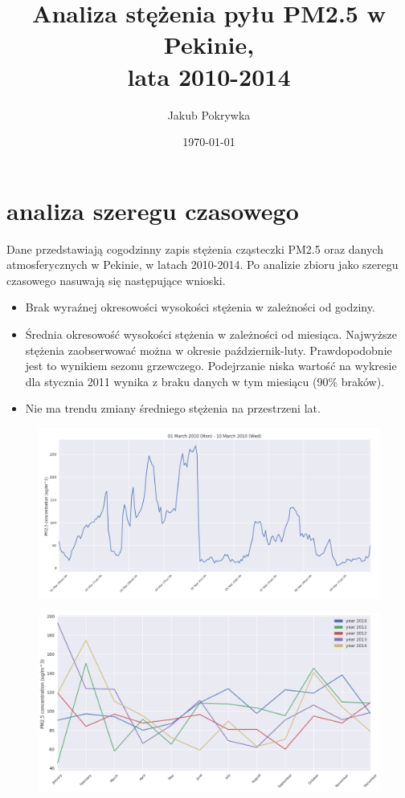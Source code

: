 \documentclass{beamer}
\title[analiza stężenia PM2.5]{Analiza stężenia pyłu PM2.5 w Pekinie, \\ lata 2010-2014}
\author{Jakub Pokrywka}
\institute[]
{\medskip
	\textit{jakubpokrywka@gmail.com} %
}
\date{\today}
\begin{document}
\begin{frame}
	\titlepage
\end{frame}

\section{analiza szeregu czasowego}
\begin{frame}
	Dane przedstawiają cogodzinny zapis stężenia cząsteczki PM2.5 oraz danych atmosferycznych w Pekinie, w latach 2010-2014.
	Po analizie zbioru jako szeregu czasowego nasuwają się następujące wnioski.
	\begin{itemize}
		\item Brak wyraźnej okresowości wysokości stężenia w zależności od godziny.
		\item Średnia okresowość wysokości stężenia w zależności od miesiąca. Najwyższe stężenia zaobserwować można w okresie październik-luty.
			Prawdopodobnie jest to wynikiem sezonu grzewczego.
			Podejrzanie niska wartość na wykresie dla stycznia 2011 wynika z braku danych w tym miesiącu (90\% braków).
		\item Nie ma trendu zmiany średniego stężenia na przestrzeni lat.
	\end{itemize}
\end{frame}

\begin{frame}
	\begin{figure}
		\includegraphics[width=1\linewidth]{time-period}
	\end{figure}
\end{frame}


\begin{frame}
	\begin{figure}
		\includegraphics[width=1\linewidth]{month-years}
	\end{figure}
\end{frame}
\end{document}
